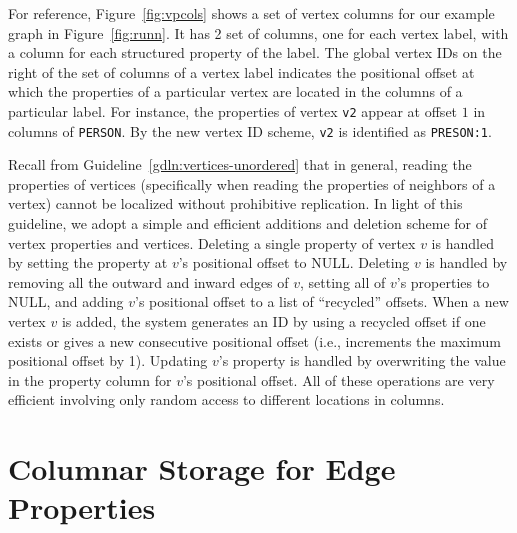 For reference, Figure~\ref{fig:vpcols} shows a set of vertex columns for our example graph in Figure~\ref{fig:runn}. It has 2 set of columns, one for each vertex label, with a column for each structured property of the label. The global vertex IDs on the right of the set of columns of a vertex label indicates the positional offset at which the properties of a particular vertex are located in the columns of a particular label. For instance, the properties of vertex \texttt{v2} appear at offset $1$ in columns of \texttt{PERSON}. By the new vertex ID scheme, \texttt{v2} is identified as \texttt{PRESON:1}. 


Recall from Guideline~\ref{gdln:vertices-unordered} that in general, reading the properties of vertices (specifically when reading the properties of neighbors of a vertex) cannot be localized without prohibitive replication. In light of this guideline, we adopt a simple and efficient additions and deletion scheme for of vertex properties and vertices. Deleting a single property of vertex $v$ is handled by setting the property at $v$'s positional offset to NULL. Deleting $v$ is handled by removing all the outward and inward edges of $v$, setting all of $v$'s properties to NULL, and adding $v$'s positional offset to a list of ``recycled'' offsets. When a new vertex $v$ is added, the system generates an ID by using a recycled offset if one exists or gives a new consecutive positional offset (i.e., increments the maximum positional offset by 1). Updating $v$'s property is handled by overwriting the value in the property column for $v$'s positional offset. All of these operations are very efficient involving only random access to different locations in columns.

\section{Columnar Storage for Edge Properties}
\label{sec:edge-property-columns}

